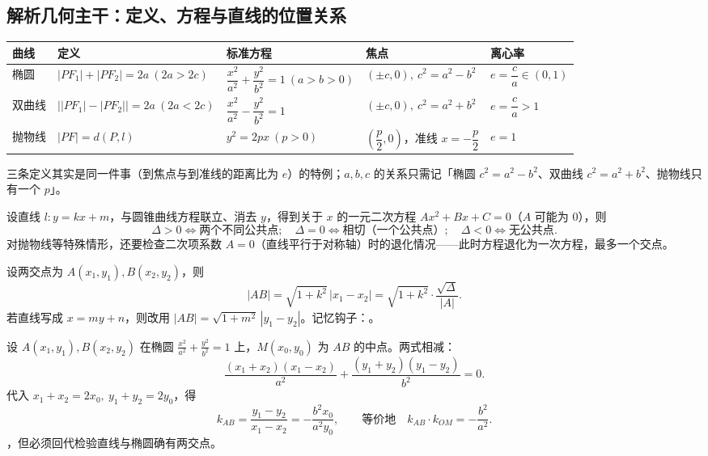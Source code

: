 \begin{explore}
\subsection{解析几何主干：定义、方程与直线的位置关系}


\begin{center}
\footnotesize
\setlength{\tabcolsep}{4pt}
\renewcommand{\arraystretch}{1.35}
\begin{tabular}{p{1.5cm}p{4.6cm}p{3.5cm}p{3.0cm}p{1.9cm}}
\toprule
曲线 & 定义 & 标准方程 & 焦点 & 离心率 \\
\midrule
椭圆 & $|PF_1|+|PF_2|=2a\ (2a>2c)$ & $\dfrac{x^2}{a^2}+\dfrac{y^2}{b^2}=1\ (a>b>0)$ & $(\pm c,0),\ c^2=a^2-b^2$ & $e=\dfrac ca\in(0,1)$ \\
双曲线 & $\bigl||PF_1|-|PF_2|\bigr|=2a\ (2a<2c)$ & $\dfrac{x^2}{a^2}-\dfrac{y^2}{b^2}=1$ & $(\pm c,0),\ c^2=a^2+b^2$ & $e=\dfrac ca>1$ \\
抛物线 & $|PF|=d(P,l)$ & $y^2=2px\ (p>0)$ & $\left(\dfrac p2,0\right)$，准线 $x=-\dfrac p2$ & $e=1$ \\
\bottomrule
\end{tabular}
\end{center}
三条定义其实是同一件事（到焦点与到准线的距离比为 $e$）的特例；$a,b,c$ 的关系只需记「椭圆 $c^2=a^2-b^2$、双曲线 $c^2=a^2+b^2$、抛物线只有一个 $p$」。

设直线 $l:y=kx+m$，与圆锥曲线方程联立、消去 $y$，得到关于 $x$ 的一元二次方程 $Ax^2+Bx+C=0$（$A$ 可能为 $0$），则
\[
  \Delta>0\iff \text{两个不同公共点};\quad
  \Delta=0\iff \text{相切（一个公共点）};\quad
  \Delta<0\iff \text{无公共点}.
\]
对抛物线等特殊情形，还要检查二次项系数 $A=0$（直线平行于对称轴）时的退化情况——此时方程退化为一次方程，最多一个交点。

设两交点为 $A(x_1,y_1),B(x_2,y_2)$，则
\[
  |AB|=\sqrt{1+k^2}\,|x_1-x_2|
  =\sqrt{1+k^2}\cdot\frac{\sqrt{\Delta}}{|A|}.
\]
若直线写成 $x=my+n$，则改用 $|AB|=\sqrt{1+m^2}\,|y_1-y_2|$。记忆钩子：。

设 $A(x_1,y_1),B(x_2,y_2)$ 在椭圆 $\frac{x^2}{a^2}+\frac{y^2}{b^2}=1$ 上，$M(x_0,y_0)$ 为 $AB$ 的中点。两式相减：
\[
  \frac{(x_1+x_2)(x_1-x_2)}{a^2}+\frac{(y_1+y_2)(y_1-y_2)}{b^2}=0.
\]
代入 $x_1+x_2=2x_0,\ y_1+y_2=2y_0$，得
\[
  k_{AB}=\frac{y_1-y_2}{x_1-x_2}=-\frac{b^2x_0}{a^2y_0},
  \qquad\text{等价地}\quad k_{AB}\cdot k_{OM}=-\frac{b^2}{a^2}.
\]
，但必须回代检验直线与椭圆确有两交点。


\end{explore}
